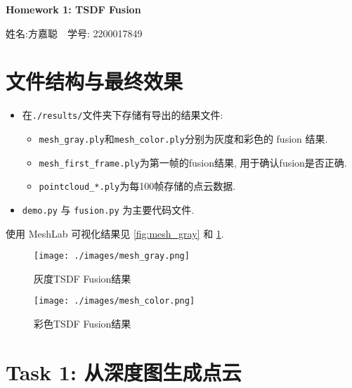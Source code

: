 \documentclass[11pt]{article}
\newcommand\1{\mathds{1}}
\begin{document}
\pagestyle{fancy}
\chead{}
\fancyfoot[R]{} 
\fancyfoot[C]{\thepage\ /\ \pageref{LastPage} \\ \textcolor{lightgray}{最后编译时间: \today}}


\begin{center}
    {\LARGE \bf Homework 1: TSDF Fusion} 

    {姓名:方嘉聪\ \  学号: 2200017849}            %
\end{center}
\section{文件结构与最终效果}
\begin{itemize}
    \item 在\texttt{./results/}文件夹下存储有导出的结果文件:
    \begin{itemize}
        \item \texttt{mesh\_gray.ply}和\texttt{mesh\_color.ply}分别为灰度和彩色的 fusion 结果. 
        \item \texttt{mesh\_first\_frame.ply}为第一帧的fusion结果, 用于确认fusion是否正确.
        \item \texttt{pointcloud\_*.ply}为每100帧存储的点云数据.
    \end{itemize}
    \item \texttt{demo.py} 与 \texttt{fusion.py} 为主要代码文件.
\end{itemize}
\vspace{1em}
使用 MeshLab 可视化结果见 \cref{fig:mesh_gray} 和 \cref{fig:mesh_color}.
\begin{figure}[htbp]
    \centering
    \begin{minipage}[b]{0.48\textwidth}
        \centering
        \texttt{[image: ./images/mesh\_gray.png]}
        \caption{灰度TSDF Fusion结果}
        \label{fig:mesh_gray}
    \end{minipage}
    \hfill
    \begin{minipage} [b]{0.48\textwidth}
        \centering
        \texttt{[image: ./images/mesh\_color.png]}
        \caption{彩色TSDF Fusion结果}
        \label{fig:mesh_color}
    \end{minipage}
\end{figure}
\section{Task 1: 从深度图生成点云}
\end{document}
